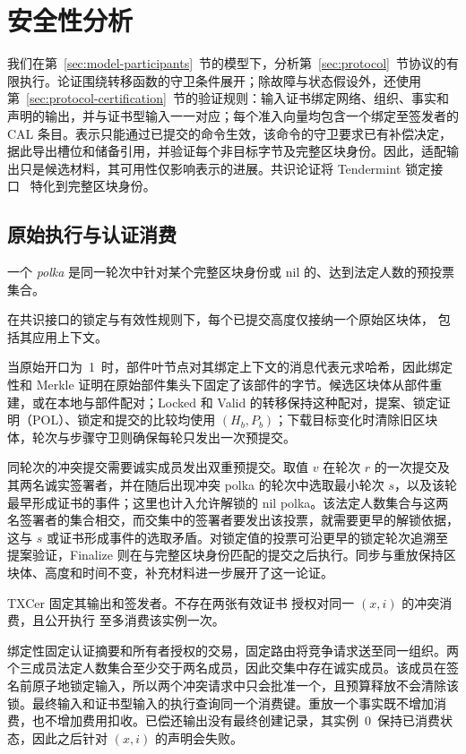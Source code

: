 \section{安全性分析}
\label{sec:security}

我们在第~\ref{sec:model-participants}~节的模型下，分析第~\ref{sec:protocol}~节协议的有限执行。论证围绕转移函数的守卫条件展开；除故障与状态假设外，还使用第~\ref{sec:protocol-certification}~节的验证规则：输入证书绑定网络、组织、事实和声明的输出，并与证书型输入一一对应；每个准入向量均包含一个绑定至签发者的 CAL 条目。表示只能通过已提交的命令生效，该命令的守卫要求已有补偿决定，据此导出槽位和储备引用，并验证每个非目标字节及完整区块身份。因此，适配输出只是候选材料，其可用性仅影响表示的进展。共识论证将 Tendermint 锁定接口~\cite{tendermint} 特化到完整区块身份。

\subsection{原始执行与认证消费}
\label{sec:security-identity}

一个 \emph{polka} 是同一轮次中针对某个完整区块身份或 nil 的、达到法定人数的预投票集合。

\begin{lemma}[原始执行的一致性]
\label{lem:security-original}
在共识接口的锁定与有效性规则下，每个已提交高度仅接纳一个原始区块体，
包括其应用上下文。
\end{lemma}
\begin{IEEEproof}
当原始开口为~1~时，部件叶节点对其绑定上下文的消息代表元求哈希，因此绑定性和 Merkle 证明在原始部件集头下固定了该部件的字节。候选区块体从部件重建，或在本地与部件配对；Locked 和 Valid 的转移保持这种配对，提案、锁定证明（POL）、锁定和提交的比较均使用 $(H_b,P_b)$；下载目标变化时清除旧区块体，轮次与步骤守卫则确保每轮只发出一次预提交。

同轮次的冲突提交需要诚实成员发出双重预提交。取值 $v$ 在轮次 $r$ 的一次提交及其两名诚实签署者，并在随后出现冲突 polka 的轮次中选取最小轮次 $s$，以及该轮最早形成证书的事件；这里也计入允许解锁的 nil polka。该法定人数集合与这两名签署者的集合相交，而交集中的签署者要发出该投票，就需要更早的解锁依据，这与 $s$ 或证书形成事件的选取矛盾。对锁定值的投票可沿更早的锁定轮次追溯至提案验证，Finalize 则在与完整区块身份匹配的提交之后执行。同步与重放保持区块体、高度和时间不变，补充材料进一步展开了这一论证。
\end{IEEEproof}

\begin{lemma}[经过认证的唯一消费]
\label{lem:security-consumption}
TXCer 固定其输出和签发者。不存在两张有效证书
授权对同一 $(x,i)$ 的冲突消费，且公开执行
至多消费该实例一次。
\end{lemma}
\begin{IEEEproof}
绑定性固定认证摘要和所有者授权的交易，固定路由将竞争请求送至同一组织。两个三成员法定人数集合至少交于两名成员，因此交集中存在诚实成员。该成员在签名前原子地锁定输入，所以两个冲突请求中只会批准一个，且预算释放不会清除该锁。最终输入和证书型输入的执行查询同一个消费键。重放一个事实既不增加消费，也不增加费用扣收。已偿还输出没有最终创建记录，其实例~0~保持已消费状态，因此之后针对 $(x,i)$ 的声明会失败。
\end{IEEEproof}


